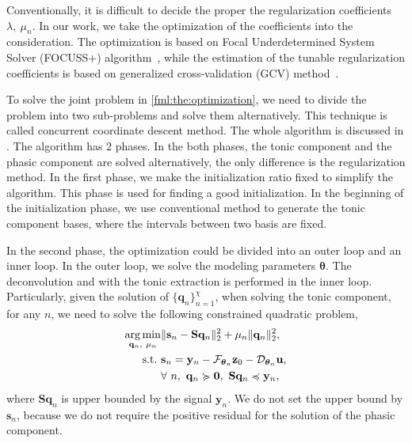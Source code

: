 \documentclass[10pt,conference]{ieeeconf}
\DeclareMathOperator*{\argmin}{arg\,min}
\begin{document}
Conventionally, it is difficult to decide the proper the regularization coefficients $\lambda,~\mu_n$. In our work, we take the optimization of the coefficients into the consideration. The optimization is based on Focal Underdetermined System Solver (FOCUSS+) algorithm~\cite{murray2005visual}, while the estimation of the tunable regularization coefficients is based on  generalized cross-validation (GCV) method~\cite{zdunek2008improved}. 

To solve the joint problem in \eqref{fml:the:optimization}, we need to divide the problem into two sub-problems and solve them alternatively. This technique is called concurrent coordinate descent method. The whole algorithm is discussed in . The algorithm has 2 phases. In the both phases, the tonic component and the phasic component are solved alternatively, the only difference is the regularization method. In the first phase, we make the initialization ratio fixed to simplify the algorithm. This phase is used for finding a good initialization. In the beginning of the initialization phase, we use conventional method to generate the tonic component bases, where the intervals between two basis are fixed.

In the second phase, the optimization could be divided into an outer loop and an inner loop. In the outer loop, we solve the modeling parameters $\boldsymbol{\theta}$. The deconvolution and with the tonic extraction is performed in the inner loop. Particularly, given the solution of $\{\mathbf{q}_n\}_{n=1}^{\chi}$, when solving the tonic component, for any $n$, we need to solve the following constrained quadratic problem,
\begin{subequations} \label{fml:the:second-tonic}
  \renewcommand{\theequation}
  {\theparentequation-\arabic{equation}}
  \begin{align}
    \argmin\limits_{\mathbf{q}_n,~\mu_n} & \lVert \mathbf{s}_n - \mathbf{S} \mathbf{q}_n \rVert^2_2 + \mu_n \lVert \mathbf{q}_n \rVert_2^2, \\
    \mathrm{s.t.}~& \mathbf{s}_n = \mathbf{y}_n - \mathcal{F}_{\boldsymbol{\theta}_n} \mathbf{z}_{0} - \mathcal{D}_{\boldsymbol{\theta}_n} \mathbf{u}, \label{fml:the:second-tonic-obj}\\
    & \forall~n,~\mathbf{q}_n \succcurlyeq \mathbf{0},~\mathbf{S}\mathbf{q}_n \preccurlyeq \mathbf{y}_n,
  \end{align}
\end{subequations}
%
where $\mathbf{S}\mathbf{q}_n$ is upper bounded by the signal $\mathbf{y}_n$. We do not set the upper bound by $\mathbf{s}_n$, because we do not require the positive residual for the solution of the phasic component.
\end{document}
